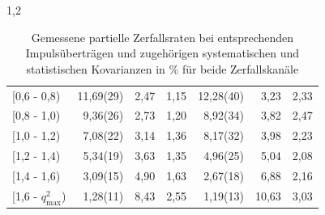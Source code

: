 \documentclass[11pt,a4paper,twoside]{report}
\begin{document}
\begin{spacing}{1,2}
\begin{table}[h]
\begin{tabular}{l|rrr|rrr}
   {[}0,6 - 0,8) & 	11,69(29)&	2,47&	1,15&	12,28(40)&	3,23&	2,33\\
   {[}0,8 - 1,0)  &	9,36(26)&	2,73&	1,20&	8,92(34)&	3,82&	2,47\\
   {[}1,0 - 1,2)  &	7,08(22)&	3,14&	1,36&	8,17(32)&	3,98&	2,23\\
   {[}1,2 - 1,4)  &	5,34(19)&	3,63&	1,35&	4,96(25)&	5,04&	2,08\\
   {[}1,4 - 1,6)  &	3,09(15)&	4,90&	1,63&	2,67(18)&	6,88&	2,16\\
   {[}1,6 - $q^2_\text{max}$)&	1,28(11)&	8,43&	2,55&	1,19(13)&	10,63&	3,03\\
   \bottomrule\bottomrule
   \end{tabular}
 \caption{Gemessene partielle Zerfallsraten bei entsprechenden Impulsüberträgen und zugehörigen systematischen und statistischen Kovarianzen in \% für beide Zerfallskanäle}
 \label{tab_GammaSigma}
 \end{table}
 \renewcommand{\arraystretch}{1.0}

\end{spacing}
\end{document}
